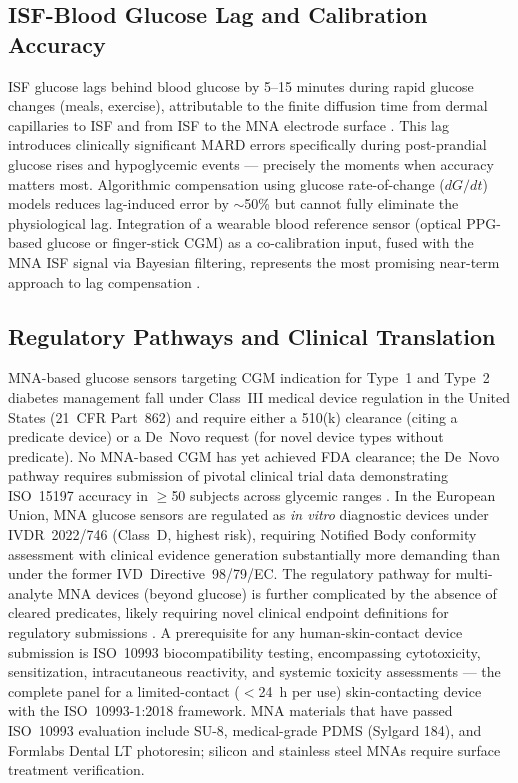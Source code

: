 \documentclass[review,1p]{elsarticle}
\begin{document}
\subsection{ISF-Blood Glucose Lag and Calibration Accuracy}
\label{subsec:lag}

ISF glucose lags behind blood glucose by 5--15 minutes during rapid glucose changes (meals, exercise), attributable to the finite diffusion time from dermal capillaries to ISF and from ISF to the MNA electrode surface \cite{Keum2023Lag}. This lag introduces clinically significant MARD errors specifically during post-prandial glucose rises and hypoglycemic events — precisely the moments when accuracy matters most. Algorithmic compensation using glucose rate-of-change ($dG/dt$) models reduces lag-induced error by $\sim$50\% but cannot fully eliminate the physiological lag. Integration of a wearable blood reference sensor (optical PPG-based glucose or finger-stick CGM) as a co-calibration input, fused with the MNA ISF signal via Bayesian filtering, represents the most promising near-term approach to lag compensation \cite{Wu2024Bayesian}.

\subsection{Regulatory Pathways and Clinical Translation}
\label{subsec:regulatory}

MNA-based glucose sensors targeting CGM indication for Type~1 and Type~2 diabetes management fall under Class~III medical device regulation in the United States (21~CFR Part~862) and require either a 510(k) clearance (citing a predicate device) or a De~Novo request (for novel device types without predicate). No MNA-based CGM has yet achieved FDA clearance; the De~Novo pathway requires submission of pivotal clinical trial data demonstrating ISO~15197 accuracy in $\geq$50 subjects across glycemic ranges \cite{Sempionatto2024Regulatory}. In the European Union, MNA glucose sensors are regulated as \textit{in vitro} diagnostic devices under IVDR~2022/746 (Class~D, highest risk), requiring Notified Body conformity assessment with clinical evidence generation substantially more demanding than under the former IVD~Directive~98/79/EC. The regulatory pathway for multi-analyte MNA devices (beyond glucose) is further complicated by the absence of cleared predicates, likely requiring novel clinical endpoint definitions for regulatory submissions \cite{Sempionatto2024Regulatory}. A prerequisite for any human-skin-contact device submission is ISO~10993 biocompatibility testing, encompassing cytotoxicity, sensitization, intracutaneous reactivity, and systemic toxicity assessments — the complete panel for a limited-contact ($<$24~h per use) skin-contacting device with the ISO~10993-1:2018 framework. MNA materials that have passed ISO~10993 evaluation include SU-8, medical-grade PDMS (Sylgard 184), and Formlabs Dental LT photoresin; silicon and stainless steel MNAs require surface treatment verification.
\end{document}
